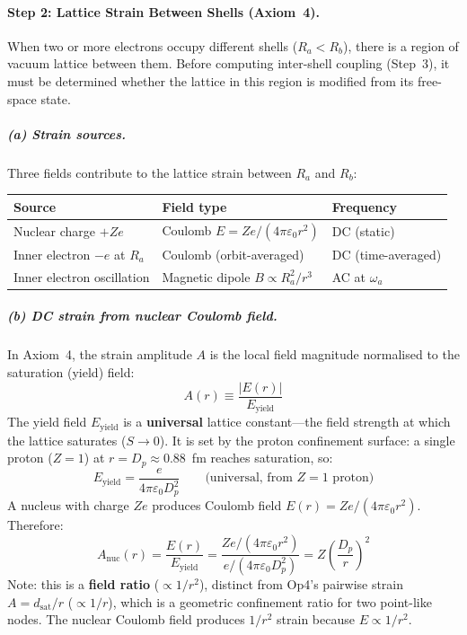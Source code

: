 \paragraph{Step 2: Lattice Strain Between Shells (Axiom~4).}

When two or more electrons occupy different shells ($R_a < R_b$),
there is a region of vacuum lattice between them.  Before computing
inter-shell coupling (Step~3), it must be determined whether the
lattice in this region is modified from its free-space state.

\subparagraph{(a) Strain sources.}
Three fields contribute to the lattice strain between
$R_a$ and $R_b$:
\begin{center}
\small
\begin{tabular}{lll}
\hline
\textbf{Source} & \textbf{Field type} & \textbf{Frequency} \\
\hline
Nuclear charge $+Ze$ & Coulomb $E = Ze/(4\pi\varepsilon_0 r^2)$
    & DC (static) \\
Inner electron $-e$ at $R_a$ & Coulomb (orbit-averaged)
    & DC (time-averaged) \\
Inner electron oscillation & Magnetic dipole $B \propto R_a^2/r^3$
    & AC at $\omega_a$ \\
\hline
\end{tabular}
\end{center}

\subparagraph{(b) DC strain from nuclear Coulomb field.}
In Axiom~4, the strain amplitude $A$ is the local field
magnitude normalised to the saturation (yield) field:
\begin{equation}
    A(r) \equiv \frac{|E(r)|}{E_{\text{yield}}}
    \label{eq:A_def}
\end{equation}
The yield field $E_{\text{yield}}$ is a \textbf{universal}
lattice constant---the field strength at which the lattice
saturates ($S \to 0$).  It is set by the proton confinement
surface: a single proton ($Z = 1$) at $r = D_p \approx 0.88$~fm
reaches saturation, so:
\begin{equation}
    E_{\text{yield}} = \frac{e}{4\pi\varepsilon_0 D_p^2}
    \qquad\text{(universal, from $Z = 1$ proton)}
\end{equation}
A nucleus with charge $Ze$ produces Coulomb field
$E(r) = Ze/(4\pi\varepsilon_0 r^2)$.  Therefore:
\begin{equation}
    A_{\text{nuc}}(r)
    = \frac{E(r)}{E_{\text{yield}}}
    = \frac{Ze/(4\pi\varepsilon_0 r^2)}{e/(4\pi\varepsilon_0 D_p^2)}
    = Z\!\left(\frac{D_p}{r}\right)^{\!2}
    \label{eq:A_nuclear}
\end{equation}
Note: this is a \textbf{field ratio} ($\propto 1/r^2$),
distinct from Op4's pairwise strain $A = d_{\text{sat}}/r$
($\propto 1/r$), which is a geometric confinement ratio
for two point-like nodes.  The nuclear Coulomb field produces
$1/r^2$ strain because $E \propto 1/r^2$.

